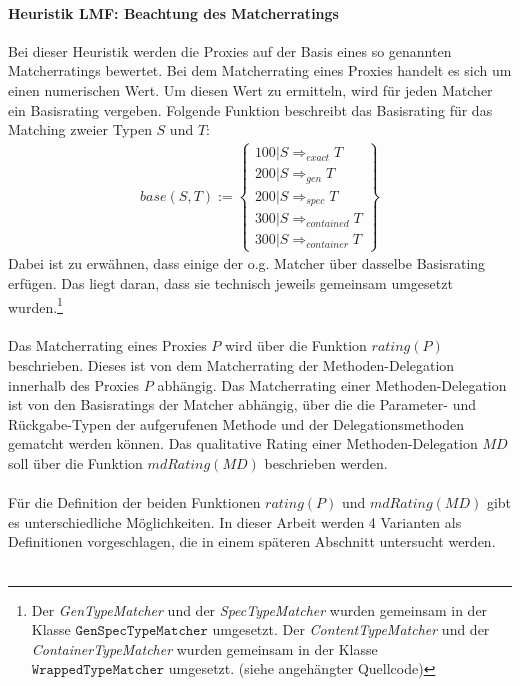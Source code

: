 \documentclass[a4paper,12pt]{article}
\begin{document}
\paragraph{Heuristik LMF: Beachtung des Matcherratings}
\noindent
\newline
Bei dieser Heuristik werden die Proxies auf der Basis eines so genannten Matcherratings bewertet. Bei dem Matcherrating eines Proxies handelt es sich um einen numerischen Wert. Um diesen Wert zu ermitteln, wird für jeden Matcher ein Basisrating vergeben. Folgende Funktion beschreibt das Basisrating für das Matching zweier Typen $S$ und $T$:
\begin{gather*}
\mathit{base(S,T)} :=  \left\{ 
				\begin{array}{l}
					100 | S \Rightarrow_{exact}  T  \\
					200 | S \Rightarrow_{gen}  T  \\
					200 | S \Rightarrow_{spec}  T  \\
					300 | S \Rightarrow_{contained}  T   \\
					300 | S \Rightarrow_{container}  T  					
				\end{array}
              \right\}
\end{gather*}
\noindent
Dabei ist zu erwähnen, dass einige der o.g. Matcher über dasselbe Basisrating erfügen. Das liegt daran, dass sie technisch jeweils gemeinsam umgesetzt wurden.\footnote{Der \emph{GenTypeMatcher} und der \emph{SpecTypeMatcher} wurden gemeinsam in der Klasse $\texttt{GenSpecTypeMatcher}$ umgesetzt. Der \emph{ContentTypeMatcher} und der \emph{ContainerTypeMatcher} wurden gemeinsam in der Klasse $\texttt{WrappedTypeMatcher}$ umgesetzt. (siehe angehängter Quellcode)}\\\\
Das Matcherrating eines Proxies $P$ wird über die Funktion $\mathit{rating(P)}$ beschrieben. Dieses ist von dem Matcherrating der Methoden-Delegation innerhalb des Proxies $P$ abhängig. Das Matcherrating einer Methoden-Delegation ist von den Basisratings der Matcher abhängig, über die die Parameter- und Rückgabe-Typen der aufgerufenen Methode und der Delegationsmethoden gematcht werden können. Das qualitative Rating einer Methoden-Delegation $\mathit{MD}$ soll über die Funktion $\mathit{mdRating(MD)}$ beschrieben werden.\\\\
Für die Definition der beiden Funktionen $\mathit{rating(P)}$ und $\mathit{mdRating(MD)}$ gibt es unterschiedliche Möglichkeiten. In dieser Arbeit werden 4 Varianten als Definitionen vorgeschlagen, die in einem späteren Abschnitt untersucht werden.\\\\
\end{document}
